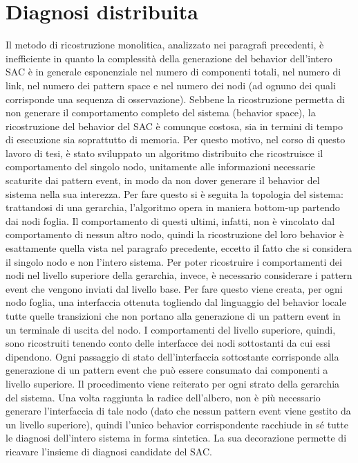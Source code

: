 \newpage
\section{Diagnosi distribuita}
Il metodo di ricostruzione monolitica, analizzato nei paragrafi precedenti, è inefficiente in quanto la complessità della generazione del behavior dell'intero SAC è in generale esponenziale nel numero di componenti totali, nel numero di link, nel numero dei pattern space e nel numero dei nodi (ad ognuno dei quali corrisponde una sequenza di osservazione). Sebbene la ricostruzione permetta di non generare il comportamento completo del sistema (behavior space), la ricostruzione del behavior del SAC è comunque costosa, sia in termini di tempo di esecuzione sia soprattutto di memoria.
Per questo motivo, nel corso di questo lavoro di tesi, è stato sviluppato un algoritmo distribuito che ricostruisce il comportamento del singolo nodo, unitamente alle informazioni necessarie scaturite dai pattern event, in modo da non dover generare il behavior del sistema nella sua interezza. Per fare questo si è seguita la topologia del sistema: trattandosi di una gerarchia, l'algoritmo opera in maniera bottom-up partendo dai nodi foglia. Il comportamento di questi ultimi, infatti, non è vincolato dal comportamento di nessun altro nodo, quindi la ricostruzione del loro behavior è esattamente quella vista nel paragrafo precedente, eccetto il fatto che si considera il singolo nodo e non l'intero sistema. Per poter ricostruire i comportamenti dei nodi nel livello superiore della gerarchia, invece, è necessario considerare i pattern event che vengono inviati dal livello base. Per fare questo viene creata, per ogni nodo foglia, una interfaccia ottenuta togliendo dal linguaggio del behavior locale tutte quelle transizioni che non portano alla generazione di un pattern event in un terminale di uscita del nodo. I comportamenti del livello superiore, quindi, sono ricostruiti tenendo conto delle interfacce dei nodi sottostanti da cui essi dipendono. Ogni passaggio di stato dell'interfaccia sottostante corrisponde alla generazione di un pattern event che può essere consumato dai componenti a livello superiore. Il procedimento viene reiterato per ogni strato della gerarchia del sistema.
Una volta raggiunta la radice dell'albero, non è più necessario generare l'interfaccia di tale nodo (dato che nessun pattern event viene gestito da un livello superiore), quindi l'unico behavior corrispondente racchiude in sé tutte le diagnosi dell'intero sistema in forma sintetica. La sua decorazione permette di ricavare l'insieme di diagnosi candidate del SAC.

